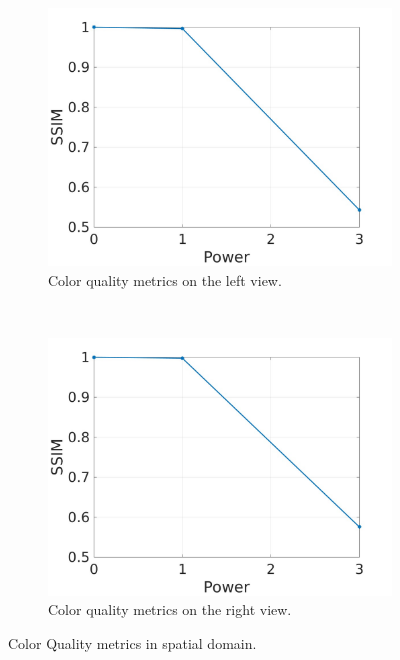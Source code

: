 \begin{figure}[h!]
    \centering
    \begin{subfigure}[t]{0.5\textwidth}
        \centering
\includegraphics[width=1\textwidth]{./img/qm_gauss/gqm_left.jpg}
          \caption{\small{Color quality metrics on the left view.}}
\label{fig:gqmcl}

    \end{subfigure}%
    ~ 
    \begin{subfigure}[t]{0.5\textwidth}
        \centering
\includegraphics[width=1\textwidth]{./img/qm_gauss/gqm_right.jpg}
           \caption{\small{Color quality metrics on the right view.}}
\label{fig:gqmdl}
    \end{subfigure}
    \caption{Color Quality metrics in spatial domain.}
    \label{fig:gqmc}
\end{figure}

